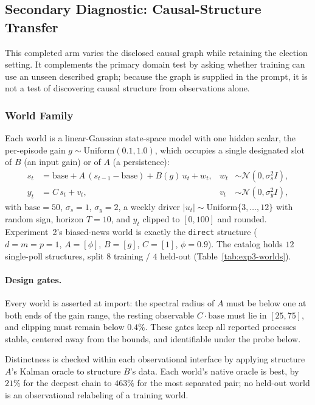 \subsection{Secondary Diagnostic: Causal-Structure Transfer}
\label{app:exp3-structures}

This completed arm varies the disclosed causal graph while retaining the election
setting. It complements the primary domain test by asking whether training can
use an unseen described graph; because the graph is supplied in the prompt, it is
not a test of discovering causal structure from observations alone.
\subsubsection{World Family}
\label{app:exp3-family}

Each world is a linear-Gaussian state-space model with one hidden scalar, the per-episode gain
$g\sim\mathrm{Uniform}(0.1,1.0)$, which occupies a single designated slot of $B$ (an input gain) or of
$A$ (a persistence):
\begin{align}
s_t &= \text{base} + A\,(s_{t-1}-\text{base}) + B(g)\,u_t + w_t, & w_t&\sim\mathcal N(0,\sigma_s^2 I),\\
y_t &= C\,s_t + v_t, & v_t&\sim\mathcal N(0,\sigma_y^2 I),
\end{align}
with $\text{base}=50$, $\sigma_s=1$, $\sigma_y=2$, a weekly driver $|u_t|\sim\mathrm{Uniform}\{3,\dots,12\}$
with random sign, horizon $T=10$, and $y_t$ clipped to $[0,100]$ and rounded. Experiment~2's biased-news
world is exactly the \texttt{direct} structure ($d{=}m{=}p{=}1$, $A{=}[\phi]$, $B{=}[g]$, $C{=}[1]$,
$\phi{=}0.9$). The catalog holds $12$ single-poll structures, split $8$ training / $4$ held-out
(Table~\ref{tab:exp3-worlds}).

\paragraph{Design gates.} Every world is asserted at import: the spectral radius
of $A$ must be below one at both ends of the gain range, the resting observable
$C\cdot\text{base}$ must lie in $[25,75]$, and clipping must remain below $0.4\%$.
These gates keep all reported processes stable, centered away from the bounds,
and identifiable under the probe below.

Distinctness is checked within each observational interface by applying
structure $A$'s Kalman oracle to structure $B$'s data. Each world's native oracle
is best, by $21\%$ for the deepest chain to $463\%$ for the most separated pair;
no held-out world is an observational relabeling of a training world.

